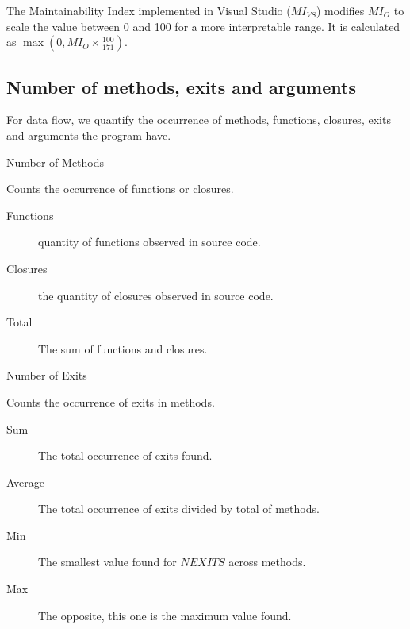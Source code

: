 The Maintainability Index implemented in Visual Studio (\(MI_{VS}\)) modifies \(MI_O\) to scale the value
between 0 and 100 for a more interpretable range.
It is calculated as \(\max(0, MI_O \times \frac{100}{171})\).

\subsection{Number of methods, exits and arguments}

For data flow, we quantify the occurrence of methods, functions, closures, exits and arguments the program have.

\begin{itemize}
  \item Number of Methods \begin{description}
          \item Counts the occurrence of functions or closures. \begin{description}
                  \item[Functions] quantity of functions observed in source code.
                  \item[Closures] the quantity of closures observed in source code.
                  \item[Total] The sum of functions and closures.
                \end{description}
        \end{description}

  \item Number of Exits \begin{description}
          \item Counts the occurrence of exits in methods. \begin{description}
                  \item[Sum] The total occurrence of exits found.
                  \item[Average] The total occurrence of exits divided by total of methods.
                  \item[Min] The smallest value found for $NEXITS$ across methods.
                  \item[Max] The opposite, this one is the maximum value found.
                \end{description}
        \end{description}


\end{itemize}
